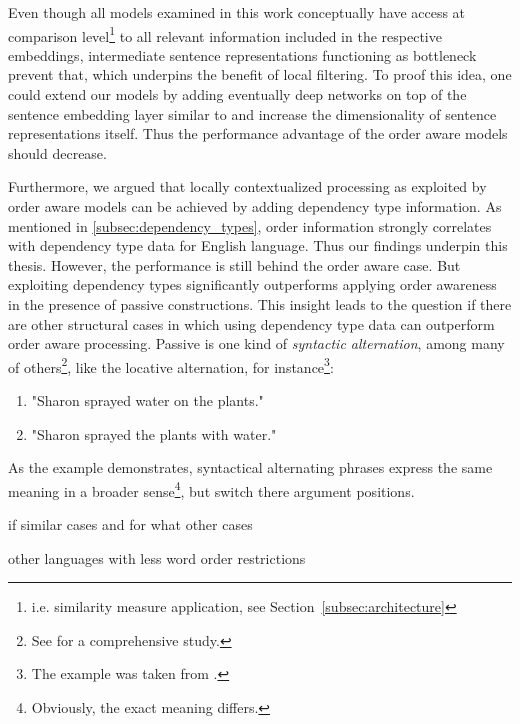
Even though all models examined in this work conceptually have access at comparison level\footnote{i.e. similarity measure application, see Section~\ref{subsec:architecture}} to all relevant information included in the respective embeddings, intermediate sentence representations functioning as bottleneck prevent that, which underpins the benefit of local filtering. To proof this idea, one could extend our models by adding eventually deep networks on top of the sentence embedding layer similar to \textcite{iyyer_deep_2015} and increase the dimensionality of sentence representations itself. Thus the performance advantage of the order aware models should decrease.

Furthermore, we argued that locally contextualized processing as exploited  by order aware models can be achieved by adding dependency type information. As mentioned in \ref{subsec:dependency_types}, order information strongly correlates with dependency type data for English language. Thus our findings underpin this thesis. However, the performance is still behind the order aware case. But exploiting dependency types significantly outperforms applying order awareness in the presence of passive constructions. This insight leads to the question if there are other structural cases in which using dependency type data can outperform order aware processing. Passive is one kind of \textit{syntactic alternation}, among many of others\footnote{See \autocite{levin_english_1993} for a comprehensive study.}, like the locative alternation, for instance\footnote{The example was taken from \autocite{levin_english_1993}.}:
\begin{enumerate}
	\setlength\itemsep{-.5em}
	\item[] "Sharon sprayed water on the plants."
	\item[] "Sharon sprayed the plants with water."
\end{enumerate}
As the example demonstrates, syntactical alternating phrases express the same meaning in a broader sense\footnote{Obviously, the exact meaning differs.}, but switch there argument positions.


 if similar cases and for what other cases


other languages with less word order restrictions


